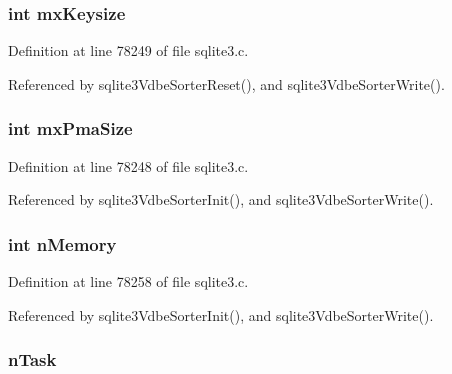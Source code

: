 \hypertarget{struct_vdbe_sorter_acedcae3c3e7ca617dac7746222492789}{}
\subsubsection[{mx\+Keysize}]{\setlength{\rightskip}{0pt plus 5cm}int mx\+Keysize}\label{struct_vdbe_sorter_acedcae3c3e7ca617dac7746222492789}


Definition at line 78249 of file sqlite3.\+c.



Referenced by sqlite3\+Vdbe\+Sorter\+Reset(), and sqlite3\+Vdbe\+Sorter\+Write().

\hypertarget{struct_vdbe_sorter_a9a5eae87f8e640583165c77d5402113f}{}
\subsubsection[{mx\+Pma\+Size}]{\setlength{\rightskip}{0pt plus 5cm}int mx\+Pma\+Size}\label{struct_vdbe_sorter_a9a5eae87f8e640583165c77d5402113f}


Definition at line 78248 of file sqlite3.\+c.



Referenced by sqlite3\+Vdbe\+Sorter\+Init(), and sqlite3\+Vdbe\+Sorter\+Write().

\hypertarget{struct_vdbe_sorter_a54d2c7df7024509fff9a4b7a1d13742e}{}
\subsubsection[{n\+Memory}]{\setlength{\rightskip}{0pt plus 5cm}int n\+Memory}\label{struct_vdbe_sorter_a54d2c7df7024509fff9a4b7a1d13742e}


Definition at line 78258 of file sqlite3.\+c.



Referenced by sqlite3\+Vdbe\+Sorter\+Init(), and sqlite3\+Vdbe\+Sorter\+Write().

\hypertarget{struct_vdbe_sorter_a90ad8d082c3b140c204a0042533f671e}{}
\subsubsection[{n\+Task}]{ n\+Task}\label{struct_vdbe_sorter_a90ad8d082c3b140c204a0042533f671e}



